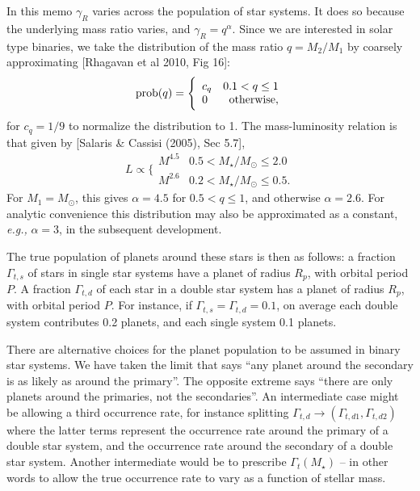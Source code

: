 \documentclass{emulateapj}
\begin{document}
In this memo $\gamma_R$ varies across the population of star systems.
It does so because the underlying mass ratio varies, and $\gamma_R = q^\alpha$. 
Since we are interested in solar type binaries, we take the distribution of the 
mass ratio $q=M_2/M_1$ by coarsely approximating [Rhagavan et al 2010, Fig 16]:
\begin{equation}
{\rm prob}(q) =
\Bigg\{\begin{array}{lr}
c_q & 0.1 < q \leq 1  \\
0 & {\rm otherwise},
\end{array}
\label{eq:mass_ratio}
\end{equation}
for $c_q = 1/9$ to normalize the distribution to 1.
The mass-luminosity relation is that given by [Salaris \& Cassisi (2005), 
Sec 5.7],
\begin{equation}
L \propto
\Bigg\{\begin{array}{lr}
M^{4.5} & 0.5 < M_\star/M_\odot \leq 2.0  \\
M^{2.6} & 0.2 < M_\star/M_\odot \leq 0.5.
\end{array}
\label{eq:mass_luminosity}
\end{equation}
For $M_1 = M_\odot$, this gives $\alpha = 4.5$ for $0.5 < q \leq 1$, and 
otherwise $\alpha = 2.6$. 
For analytic convenience this distribution may also be approximated as 
a constant, \textit{e.g.,} $\alpha = 3$, in the subsequent development.

The true population of planets around these stars is then as follows:
a fraction $\Gamma_{t,s}$ of stars in single star systems 
	have a planet of radius $R_p$, with orbital period $P$.
A fraction $\Gamma_{t,d}$ of each star in a double star 
	system has a planet of radius $R_p$, with orbital period $P$. For instance, 
	if $\Gamma_{t,s} = \Gamma_{t,d} = 0.1$, on average each double 
	system contributes 0.2 planets, and each single system 0.1 planets.

There are alternative choices for the planet population to be assumed in binary 
star systems.
We have taken the limit that says ``any planet around the secondary is as 
likely as around the primary''.
The opposite extreme says ``there are only planets around the primaries, not the 
secondaries''.
An intermediate case might be allowing a third occurrence rate, for instance 
splitting $\Gamma_{t,d} \rightarrow (\Gamma_{t,d1}, \Gamma_{t,d2})$ where the 
latter terms represent the occurrence rate around the primary of a double star 
system, and the occurrence rate around the secondary of a double star system.
Another intermediate would be to prescribe $\Gamma_{t}(M_\star)$ -- in other 
words to allow the true occurrence rate to vary as a function of stellar mass.
\end{document}
